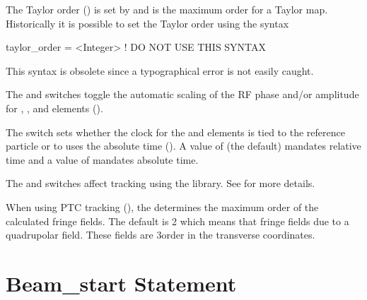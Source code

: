 The Taylor order () is set by
 and is the maximum order for a Taylor map.
Historically it is possible to set the Taylor order using the syntax
\begin{example}
  taylor_order = <Integer>   ! DO NOT USE THIS SYNTAX
\end{example}
This syntax is obsolete since a typographical error is not easily caught.

The  and  switches
toggle the automatic scaling of the RF phase and/or amplitude for
, , and  elements ().

The  switch sets whether the clock for the
 and  elements is tied to the reference
particle or to uses the absolute time (). A value of
 (the default) mandates relative time and a value of
 mandates absolute time.

The  and  switches affect
tracking using the  library. See  for more
details.

When using PTC tracking (), the
 determines the maximum order of
the calculated fringe fields. The default is 2 which means that fringe
fields due to a quadrupolar field. These fields are 3\Rd order in the
transverse coordinates.

\section{Beam_start Statement} \label{s:beam.start}

